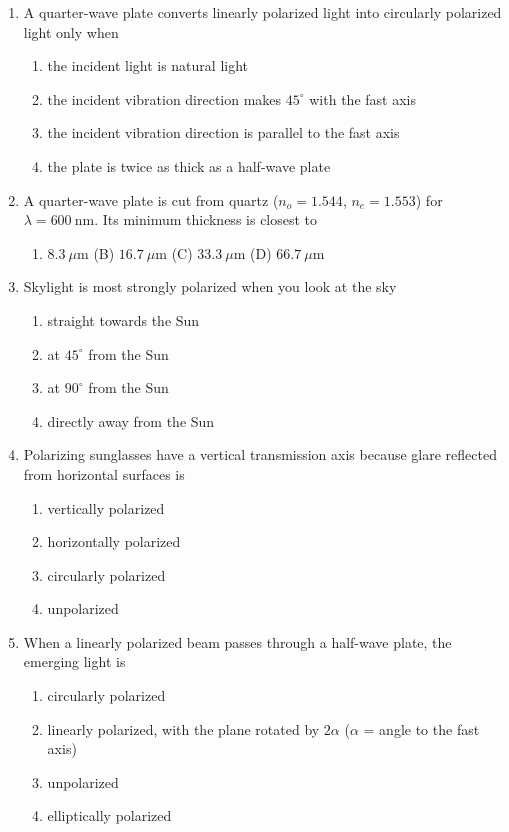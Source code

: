 ﻿\documentclass[11pt]{ctexart}
\begin{document}
\begin{enumerate}[label=\textbf{Q\arabic*.},leftmargin=2.5em,itemsep=2pt,topsep=2pt]
\item A quarter-wave plate converts linearly polarized light into circularly polarized light only when
\begin{enumerate}[label=(\Alph*),leftmargin=2.4em,itemsep=0pt,topsep=1pt,parsep=0pt]
\item the incident light is natural light
\item the incident vibration direction makes $45^\circ$ with the fast axis
\item the incident vibration direction is parallel to the fast axis
\item the plate is twice as thick as a half-wave plate
\end{enumerate}

\item A quarter-wave plate is cut from quartz ($n_o=1.544$, $n_e=1.553$) for $\lambda=600\ \mathrm{nm}$.
Its minimum thickness is closest to
\begin{enumerate}[label=(\Alph*),leftmargin=2.4em,itemsep=0pt,topsep=1pt,parsep=0pt]
\item $8.3\ \mu\mathrm{m}$ \qquad (B) $16.7\ \mu\mathrm{m}$ \qquad (C) $33.3\ \mu\mathrm{m}$ \qquad (D) $66.7\ \mu\mathrm{m}$
\end{enumerate}

\item Skylight is most strongly polarized when you look at the sky
\begin{enumerate}[label=(\Alph*),leftmargin=2.4em,itemsep=0pt,topsep=1pt,parsep=0pt]
\item straight towards the Sun
\item at $45^\circ$ from the Sun
\item at $90^\circ$ from the Sun
\item directly away from the Sun
\end{enumerate}

\item Polarizing sunglasses have a vertical transmission axis because glare reflected from
horizontal surfaces is
\begin{enumerate}[label=(\Alph*),leftmargin=2.4em,itemsep=0pt,topsep=1pt,parsep=0pt]
\item vertically polarized
\item horizontally polarized
\item circularly polarized
\item unpolarized
\end{enumerate}

\item When a linearly polarized beam passes through a half-wave plate, the emerging light is
\begin{enumerate}[label=(\Alph*),leftmargin=2.4em,itemsep=0pt,topsep=1pt,parsep=0pt]
\item circularly polarized
\item linearly polarized, with the plane rotated by $2\alpha$ ($\alpha$ = angle to the fast axis)
\item unpolarized
\item elliptically polarized
\end{enumerate}
\end{enumerate}
\end{document}
